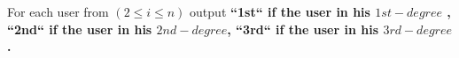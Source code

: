For each user from $(2 \le i \le n)$ output \bf{``1st``} if the user in his $1st-degree$ , \bf{``2nd``} if the user in his $2nd-degree$, \bf{``3rd``} if the user in his $3rd-degree$.